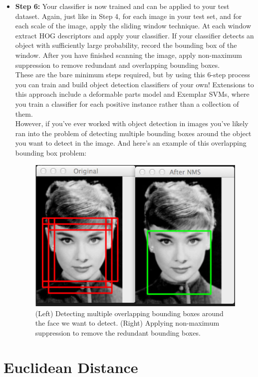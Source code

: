 \begin{itemize}
            \item \textbf{Step 6:} Your classifier is now trained and can be applied to your test dataset. Again, just like in Step 4, for each image in your test set, and for each scale of the image, apply the sliding window technique. 
                At each window extract HOG descriptors and apply your classifier. If your classifier detects an object with sufficiently large probability, record the bounding box of the window. After you have finished scanning the image, 
                apply non-maximum suppression to remove redundant and overlapping bounding boxes. \\ 
                \vspace{2mm}
                These are the bare minimum steps required, but by using this 6-step process you can train and build object detection classifiers of your own! Extensions to this approach include a deformable parts model and Exemplar SVMs, 
                where you train a classifier for each positive instance rather than a collection of them. \\ 
                \vspace{2mm}
                However, if you’ve ever worked with object detection in images you’ve likely ran into the problem of detecting multiple bounding boxes around the object you want to detect in the image. And here’s an example of this overlapping bounding box problem:
                \begin{figure}[H]
                    \centering
                    \includegraphics[width=0.6\linewidth]{img/multiple-overlapping.jpg}
                    \caption{(Left) Detecting multiple overlapping bounding boxes around the face we want to detect. (Right) Applying non-maximum suppression to remove the redundant bounding boxes.}
                \end{figure}
        \end{itemize}
\section{Euclidean Distance}

